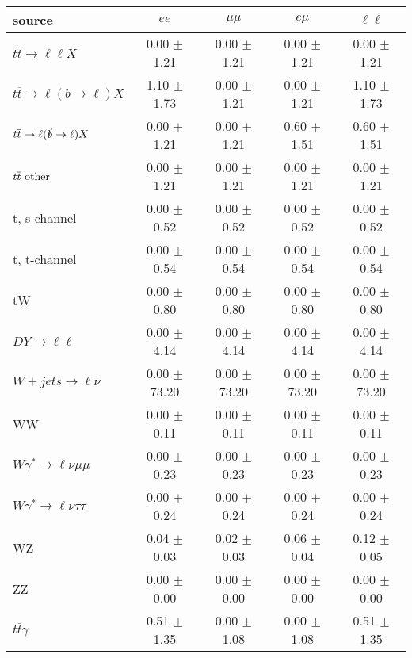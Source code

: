 \begin{tabular}{l|cccc} \hline\hline
source & $ee$ & $\mu\mu$ & $e\mu$ & $\ell\ell $ \\
\hline
$t\overline{t} \rightarrow \ell \ell X$ &  0.00 $\pm$  1.21 &  0.00 $\pm$  1.21 &  0.00 $\pm$  1.21 &  0.00 $\pm$  1.21 \\
$t\overline{t} \rightarrow \ell (b \rightarrow \ell) X$ &  1.10 $\pm$  1.73 &  0.00 $\pm$  1.21 &  0.00 $\pm$  1.21 &  1.10 $\pm$  1.73 \\
$t\overline{t} \rightarrow \ell (\slashed b \rightarrow \ell) X$ &  0.00 $\pm$  1.21 &  0.00 $\pm$  1.21 &  0.60 $\pm$  1.51 &  0.60 $\pm$  1.51 \\
        $t\overline{t}\ \rm{other}$ &  0.00 $\pm$  1.21 &  0.00 $\pm$  1.21 &  0.00 $\pm$  1.21 &  0.00 $\pm$  1.21 \\
\hline
                       t, s-channel &  0.00 $\pm$  0.52 &  0.00 $\pm$  0.52 &  0.00 $\pm$  0.52 &  0.00 $\pm$  0.52 \\
                       t, t-channel &  0.00 $\pm$  0.54 &  0.00 $\pm$  0.54 &  0.00 $\pm$  0.54 &  0.00 $\pm$  0.54 \\
                                 tW &  0.00 $\pm$  0.80 &  0.00 $\pm$  0.80 &  0.00 $\pm$  0.80 &  0.00 $\pm$  0.80 \\
\hline
         $DY \rightarrow \ell \ell$ &  0.00 $\pm$  4.14 &  0.00 $\pm$  4.14 &  0.00 $\pm$  4.14 &  0.00 $\pm$  4.14 \\
      $W+jets \rightarrow \ell \nu$ &  0.00 $\pm$ 73.20 &  0.00 $\pm$ 73.20 &  0.00 $\pm$ 73.20 &  0.00 $\pm$ 73.20 \\
                                 WW &  0.00 $\pm$  0.11 &  0.00 $\pm$  0.11 &  0.00 $\pm$  0.11 &  0.00 $\pm$  0.11 \\
\hline
$W\gamma^{*} \rightarrow \ell \nu \mu\mu$ &  0.00 $\pm$  0.23 &  0.00 $\pm$  0.23 &  0.00 $\pm$  0.23 &  0.00 $\pm$  0.23 \\
$W\gamma^{*} \rightarrow \ell \nu \tau\tau$ &  0.00 $\pm$  0.24 &  0.00 $\pm$  0.24 &  0.00 $\pm$  0.24 &  0.00 $\pm$  0.24 \\
                                 WZ &  0.04 $\pm$  0.03 &  0.02 $\pm$  0.03 &  0.06 $\pm$  0.04 &  0.12 $\pm$  0.05 \\
                                 ZZ &  0.00 $\pm$  0.00 &  0.00 $\pm$  0.00 &  0.00 $\pm$  0.00 &  0.00 $\pm$  0.00 \\
\hline
              $t\overline{t}\gamma$ &  0.51 $\pm$  1.35 &  0.00 $\pm$  1.08 &  0.00 $\pm$  1.08 &  0.51 $\pm$  1.35 \\

\end{tabular}
